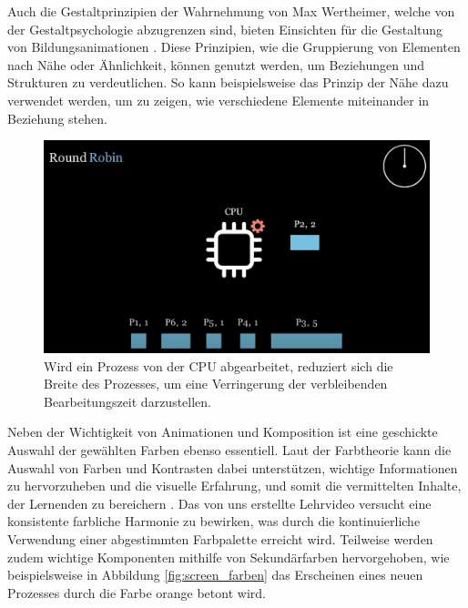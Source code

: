Auch die Gestaltprinzipien der Wahrnehmung von Max Wertheimer, welche von der Gestaltpsychologie abzugrenzen sind, bieten Einsichten für die Gestaltung von Bildungsanimationen \autocite{wertheimer_untersuchungen_2017}. Diese Prinzipien, wie die Gruppierung von Elementen nach Nähe oder Ähnlichkeit, können genutzt werden, um Beziehungen und Strukturen zu verdeutlichen. So kann beispielsweise das Prinzip der Nähe dazu verwendet werden, um zu zeigen, wie verschiedene Elemente miteinander in Beziehung stehen. 

\begin{figure}[h]
	\centering
	\includegraphics[width=0.8\linewidth]{img/screen_komposition.png} 
	\caption{Wird ein Prozess von der \ac{CPU} abgearbeitet, reduziert sich die Breite des Prozesses, um eine Verringerung der verbleibenden Bearbeitungszeit darzustellen.}
	\label{fig:screen_komposition} 
\end{figure}


Neben der Wichtigkeit von Animationen und Komposition ist eine geschickte Auswahl der gewählten Farben ebenso essentiell. Laut der Farbtheorie kann die Auswahl von Farben und Kontrasten dabei unterstützen, wichtige Informationen zu hervorzuheben und die visuelle Erfahrung, und somit die vermittelten Inhalte, der Lernenden zu bereichern \autocite{ballard_art_1964}. Das von uns erstellte Lehrvideo versucht eine konsistente farbliche Harmonie zu bewirken, was durch die kontinuierliche Verwendung einer abgestimmten Farbpalette erreicht wird. Teilweise werden zudem wichtige Komponenten mithilfe von Sekundärfarben hervorgehoben, wie beispielsweise in Abbildung \ref{fig:screen_farben} das Erscheinen eines neuen Prozesses durch die Farbe orange betont wird. 

